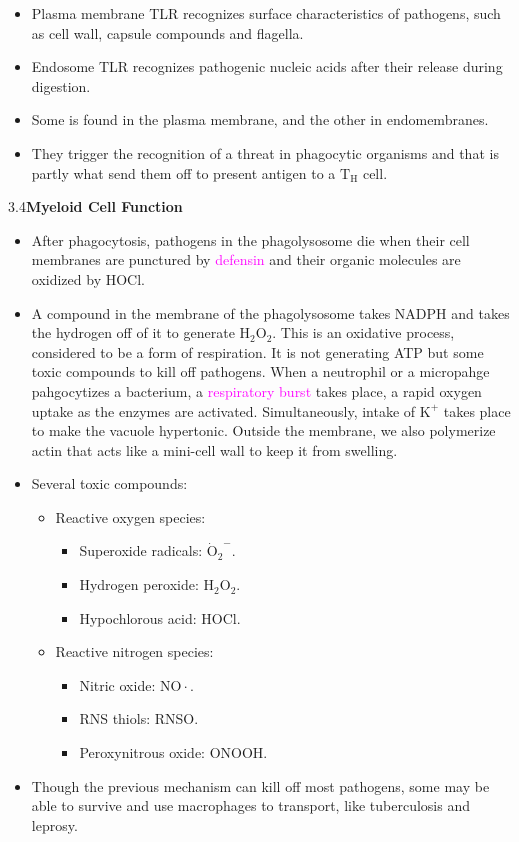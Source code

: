 \documentclass[UTF8]{book}
\newcommand{\concept}[1]{\textcolor{magenta}{#1}}
\begin{document}
\begin{itemize}
\begin{itemize}
	\begin{itemize}
		\item Plasma membrane TLR recognizes surface characteristics of pathogens, such as cell wall, capsule compounds and flagella.
		\item Endosome TLR recognizes pathogenic nucleic acids after their release during digestion.
	\end{itemize}
	\begin{itemize}
		\item Some is found in the plasma membrane, and the other in endomembranes.
		\item They trigger the recognition of a threat in phagocytic organisms and that is partly what send them off to present antigen to a $\mathrm{T_H}$ cell.
	\end{itemize}
\end{itemize}
\end{itemize}
3.4\quad \textbf{Myeloid Cell Function}
\begin{itemize}
\item After phagocytosis, pathogens in the phagolysosome die when their cell membranes are punctured by \concept{defensin} and their organic molecules are oxidized by HOCl.
\item A compound in the membrane of the phagolysosome takes NADPH and takes the hydrogen off of it to generate $\mathrm{H_2O_2}$. This is an oxidative process, considered to be a form of respiration. It is not generating ATP but some toxic compounds to kill off pathogens. When a neutrophil or a micropahge pahgocytizes a bacterium, a \concept{respiratory burst} takes place, a rapid oxygen uptake as the enzymes are activated. Simultaneously, intake of $\mathrm{K}^+$ takes place to make the vacuole hypertonic. Outside the membrane, we also polymerize actin that acts like a mini-cell wall to keep it from swelling.
\item Several toxic compounds:
\begin{itemize}
	\item Reactive oxygen species:
	\begin{itemize}
		\item Superoxide radicals: $\mathrm{\dot{O}_2}^-$.
		\item Hydrogen peroxide: $\mathrm{H_2O_2}$.
		\item Hypochlorous acid: HOCl.
	\end{itemize}
	\item Reactive nitrogen species:
	\begin{itemize}
		\item Nitric oxide: $\mathrm{NO\cdot}$.
		\item RNS thiols: RNSO.
		\item Peroxynitrous oxide: ONOOH. 
	\end{itemize}
\end{itemize}
\item Though the previous mechanism can kill off most pathogens, some may be able to survive and use macrophages to transport, like tuberculosis and leprosy.
\end{itemize}
\end{document}
